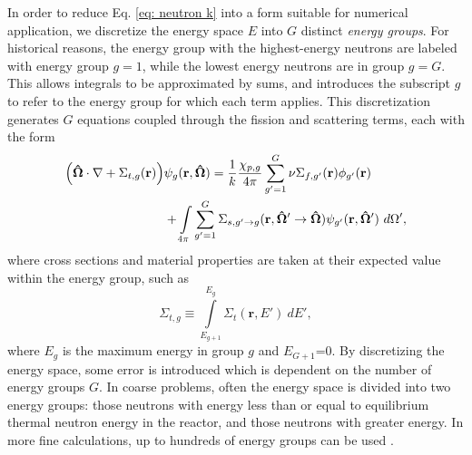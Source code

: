 In order to reduce Eq. \ref{eq: neutron k} into a form suitable for numerical application, we discretize
the energy space $E$ into $G$ distinct \emph{energy groups}.  For historical reasons, the energy group with
the highest-energy neutrons are labeled with energy group $g=1$, while the lowest energy neutrons are in group
$g=G$.  This allows integrals to be approximated by sums, and introduces the subscript $g$ to refer to the
energy group for which each term applies.  This discretization generates $G$ equations coupled through the
fission and scattering terms, each with the form
\begin{align}\label{eq: neutron energy}
  \qty(\mathbf{\hat\Omega}\cdot\nabla +
  \Sigma_{t,g}(\mathbf{r}))&\psi_g(\mathbf{r},\mathbf{\hat\Omega}) =
  \frac{1}{k}\frac{\chi_{p,g}}{4\pi}\sum_{g'=1}^G \nu\Sigma_{f,g'}(\mathbf{r})\phi_{g'}(\mathbf{r}) \nonumber \\
  & + \int\limits_{4\pi}^{} \sum_{g'=1}^G \Sigma_{s,g'\to g}(\mathbf{r},\mathbf{\hat\Omega'\to\hat\Omega})
  \psi_{g'}(\mathbf{r},\mathbf{\hat\Omega'}) \ d\Omega',
\end{align}
where cross sections and material properties are taken at their expected value within the energy group, such
as
\begin{equation}
  \Sigma_{t,g} \equiv \int\limits_{E_{g+1}}^{E_{g}} \Sigma_t(\mathbf{r},E')\ dE',
\end{equation}
where $E_g$ is the maximum energy in group $g$ and $E_{G+1}$=0.  By discretizing the energy space, some error
is introduced which is dependent on the number of energy groups $G$.  In coarse problems, often the energy
space is divided into two energy groups: those neutrons with energy less than or equal to equilibrium thermal
neutron energy in the reactor, and those neutrons with greater energy.
In more fine calculations, up to hundreds of energy groups can be used
\cite{lewistrans}.

